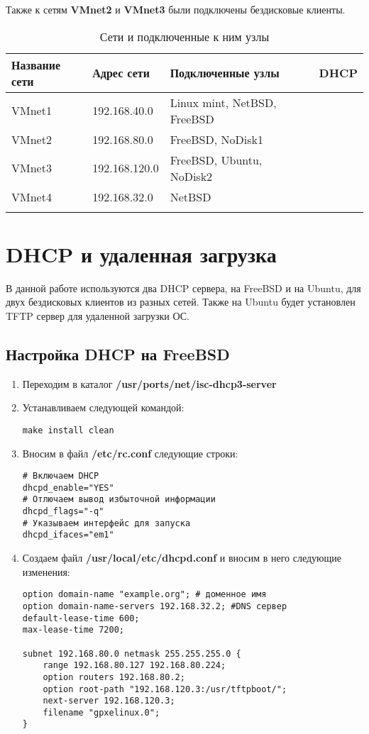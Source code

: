 \documentclass[a4paper, 12pt]{article}		%
\newcommand{\cmark}{\ding{52}}%
\newcommand{\xmark}{\ding{56}}
\begin{document}
Также к сетям \textbf{VMnet2} и \textbf{VMnet3} были подключены бездисковые клиенты.
\begin{longtabu} to \textwidth {|X[ c , m ] |X[ c , m ] | X[2, c , m ]|X[c , m ]|}\firsthline\hline

\textbf{Название сети}&\textbf{Адрес сети}&\textbf{Подключенные узлы}&\textbf{DHCP}\\ \hline \endfirsthead	
VMnet1&192.168.40.0&Linux mint, NetBSD, FreeBSD&\xmark\\ \hline
VMnet2&192.168.80.0&FreeBSD, NoDisk1&\xmark\\ \hline
VMnet3&192.168.120.0&FreeBSD, Ubuntu, NoDisk2&\xmark\\ \hline
VMnet4&192.168.32.0&NetBSD&\cmark\\ \hline
\caption{Сети и подключенные к ним узлы}
\end{longtabu}

\section{DHCP и удаленная загрузка}
В данной работе используются два DHCP сервера, на FreeBSD и на Ubuntu, для двух бездисковых клиентов из разных сетей. Также на Ubuntu будет установлен TFTP сервер для удаленной загрузки ОС.
\subsection{Настройка DHCP на FreeBSD}
\begin{enumerate}
\item Переходим в каталог \textbf{/usr/ports/net/isc-dhcp3-server}
\item Устанавливаем следующей командой:
\begin{lstlisting}[language={}]
make install clean
\end{lstlisting}
\item Вносим в файл \textbf{/etc/rc.conf} следующие строки:
\begin{lstlisting}[language={}]
# Включаем DHCP
dhcpd_enable="YES"
# Отлючаем вывод избыточной информации
dhcpd_flags="-q" 
# Указываем интерфейс для запуска
dhcpd_ifaces="em1" 
\end{lstlisting}
\item Создаем файл \textbf{/usr/local/etc/dhcpd.conf} и вносим в него следующие изменения:
\begin{lstlisting}[language={}]
option domain-name "example.org"; # доменное имя
option domain-name-servers 192.168.32.2; #DNS сервер
default-lease-time 600; 
max-lease-time 7200; 

subnet 192.168.80.0 netmask 255.255.255.0 {
    range 192.168.80.127 192.168.80.224;
    option routers 192.168.80.2;
    option root-path "192.168.120.3:/usr/tftpboot/";
    next-server 192.168.120.3;
    filename "gpxelinux.0";
}
\end{lstlisting}
\end{enumerate}
\end{document}
